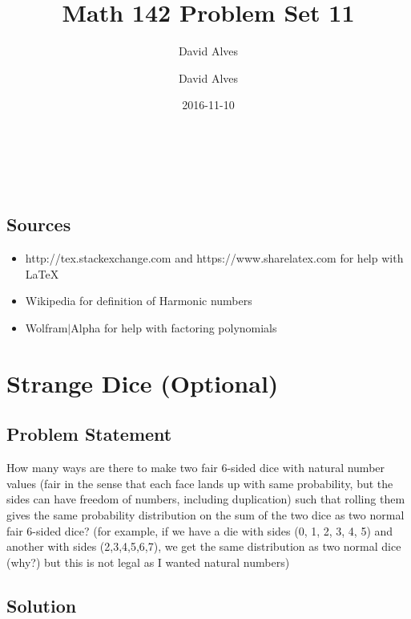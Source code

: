 \documentclass[12pt]{article}
\author{David Alves}
\title{Math 142 Problem Set 11}
\author{David Alves}
\date{2016-11-10}
\newcommand{\ProblemStatement}[1]{
\subsection*{Problem Statement}
#1
\subsection*{Solution}
}
\begin{document}

\begin{center}
\large \thetitle \\
\theauthor \\
\thedate
\end{center}

\subsection*{Sources}

    \begin{itemize}
    \item http://tex.stackexchange.com and https://www.sharelatex.com for help with \LaTeX
    \item Wikipedia for definition of Harmonic numbers
    \item Wolfram$\vert$Alpha for help with factoring polynomials
    \end{itemize}

\section{Strange Dice (Optional)}
\ProblemStatement{
How many ways are there to make two fair 6-sided dice with natural number values (fair in the sense that each face lands up with same probability, but the sides can have freedom of numbers, including duplication) such that rolling them gives the same probability distribution on the sum of the two dice as two normal fair 6-sided dice? (for example, if we have a die with sides (0, 1, 2, 3, 4, 5) and another with sides (2,3,4,5,6,7), we get the same distribution as two normal dice (why?) but this is not legal as I wanted natural numbers)
}
\end{document}
